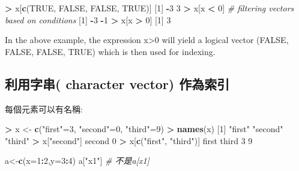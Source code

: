 \documentclass[]{book}
\newenvironment{Shaded}{\begin{snugshade}}{\end{snugshade}}
\newcommand{\KeywordTok}[1]{\textcolor[rgb]{0.13,0.29,0.53}{\textbf{#1}}}
\newcommand{\DataTypeTok}[1]{\textcolor[rgb]{0.13,0.29,0.53}{#1}}
\newcommand{\DecValTok}[1]{\textcolor[rgb]{0.00,0.00,0.81}{#1}}
\newcommand{\StringTok}[1]{\textcolor[rgb]{0.31,0.60,0.02}{#1}}
\newcommand{\CommentTok}[1]{\textcolor[rgb]{0.56,0.35,0.01}{\textit{#1}}}
\newcommand{\OtherTok}[1]{\textcolor[rgb]{0.56,0.35,0.01}{#1}}
\newcommand{\OperatorTok}[1]{\textcolor[rgb]{0.81,0.36,0.00}{\textbf{#1}}}
\newcommand{\NormalTok}[1]{#1}
\theoremstyle{definition}
\theoremstyle{definition}
\theoremstyle{definition}
\theoremstyle{remark}
\begin{document}
\begin{Shaded}
\begin{Highlighting}[]
\OperatorTok{>}\StringTok{ }\NormalTok{x[}\KeywordTok{c}\NormalTok{(}\OtherTok{TRUE}\NormalTok{, }\OtherTok{FALSE}\NormalTok{, }\OtherTok{FALSE}\NormalTok{, }\OtherTok{TRUE}\NormalTok{)]}
\NormalTok{[}\DecValTok{1}\NormalTok{] }\OperatorTok{-}\DecValTok{3}  \DecValTok{3}
\OperatorTok{>}\StringTok{ }\NormalTok{x[x }\OperatorTok{<}\StringTok{ }\DecValTok{0}\NormalTok{]  }\CommentTok{# filtering vectors based on conditions}
\NormalTok{[}\DecValTok{1}\NormalTok{] }\OperatorTok{-}\DecValTok{3} \OperatorTok{-}\DecValTok{1}
\OperatorTok{>}\StringTok{ }\NormalTok{x[x }\OperatorTok{>}\StringTok{ }\DecValTok{0}\NormalTok{]}
\NormalTok{[}\DecValTok{1}\NormalTok{] }\DecValTok{3}
\end{Highlighting}
\end{Shaded}

In the above example, the expression x\textgreater{}0 will yield a
logical vector (FALSE, FALSE, FALSE, TRUE) which is then used for
indexing.

\subsection{利用字串( character vector)
作為索引}\label{-character-vector-}

每個元素可以有名稱:

\begin{Shaded}
\begin{Highlighting}[]
\OperatorTok{>}\StringTok{ }\NormalTok{x <-}\StringTok{ }\KeywordTok{c}\NormalTok{(}\StringTok{"first"}\NormalTok{=}\DecValTok{3}\NormalTok{, }\StringTok{"second"}\NormalTok{=}\DecValTok{0}\NormalTok{, }\StringTok{"third"}\NormalTok{=}\DecValTok{9}\NormalTok{)}
\OperatorTok{>}\StringTok{ }\KeywordTok{names}\NormalTok{(x)}
\NormalTok{[}\DecValTok{1}\NormalTok{] }\StringTok{"first"}  \StringTok{"second"} \StringTok{"third"} 
\OperatorTok{>}\StringTok{ }\NormalTok{x[}\StringTok{"second"}\NormalTok{]}
\NormalTok{second }
\DecValTok{0} 
\OperatorTok{>}\StringTok{ }\NormalTok{x[}\KeywordTok{c}\NormalTok{(}\StringTok{"first"}\NormalTok{, }\StringTok{"third"}\NormalTok{)]}
\NormalTok{first third }
\DecValTok{3}     \DecValTok{9}
\end{Highlighting}
\end{Shaded}

\begin{Shaded}
\begin{Highlighting}[]
\NormalTok{a<-}\KeywordTok{c}\NormalTok{(}\DataTypeTok{x=}\DecValTok{1}\OperatorTok{:}\DecValTok{2}\NormalTok{,}\DataTypeTok{y=}\DecValTok{3}\OperatorTok{:}\DecValTok{4}\NormalTok{)}
\NormalTok{a[}\StringTok{"x1"}\NormalTok{] }\CommentTok{# 不是a[x1]}
\end{Highlighting}
\end{Shaded}
\end{document}
